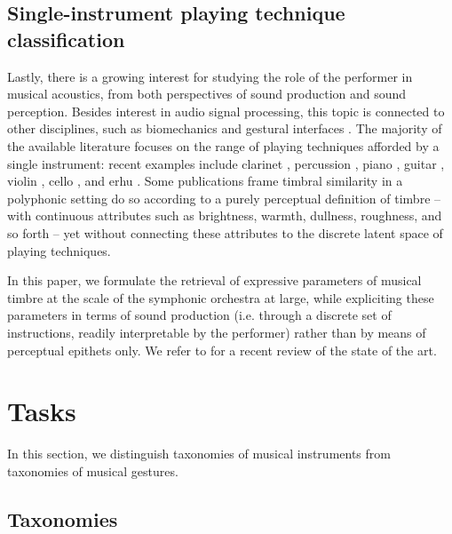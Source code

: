\documentclass{article}
\makeatletter
\newcommand*{\ie}{i.e.\@\xspace}
\makeatother
\begin{document}
\subsection{Single-instrument playing technique classification}
Lastly, there is a growing interest for studying the role of the performer in musical acoustics, from both perspectives of sound production and sound perception.
Besides interest in audio signal processing, this topic is connected to other disciplines, such as biomechanics and gestural interfaces \cite{metcalf2014frontiers}.
The majority of the available literature focuses on the range of playing techniques afforded by a single instrument: recent examples include clarinet \cite{loureiro2004ismir}, percussion \cite{tindale2004ismir}, piano \cite{bernays2013smc}, guitar \cite{foulon2013cmmr,su2014ismir,chen2015ismir}, violin \cite{young2008nime}, cello \cite[chapter 6]{chudy2016phd}, and erhu \cite{yang2014fma}.
Some publications frame timbral similarity in a polyphonic setting do so according to a purely perceptual definition of timbre -- with continuous attributes such as brightness, warmth, dullness, roughness, and so forth \cite{antoine2018isma} -- yet without connecting these attributes to the discrete latent space of playing techniques.

In this paper, we formulate the retrieval of expressive parameters of musical timbre at the scale of the symphonic orchestra at large, while expliciting these parameters in terms of sound production (\ie{} through a discrete set of instructions, readily interpretable by the performer) rather than by means of perceptual epithets only.
We refer to \cite{leman2017chapter} for a recent review of the state of the art.


\section{Tasks}
In this section, we distinguish taxonomies of musical instruments from taxonomies of musical gestures.

\subsection{Taxonomies}
\end{document}
